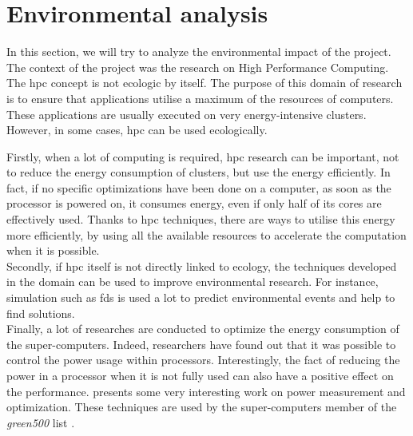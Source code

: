 
\clearpage{}
\section{Environmental analysis}

In this section, we will try to analyze the environmental impact of the
project.\\

The context of the project was the research on High Performance Computing. The
\gls{hpc} concept is not ecologic by itself. The purpose of this domain of
research is to ensure that applications utilise a maximum of the resources of
computers. These applications are usually executed on very energy-intensive
clusters. However, in some cases, \gls{hpc} can be used ecologically.

Firstly, when a lot of computing is required, \gls{hpc} research can be
important, not to reduce the energy consumption of clusters, but use the energy
efficiently. In fact, if no specific optimizations have been done on a computer,
as soon as the processor is powered on, it consumes energy, even if only half of
its cores are effectively used. Thanks to \gls{hpc} techniques, there are ways
to utilise this energy more efficiently, by using all the available resources to
accelerate the computation when it is possible.\\

Secondly, if \gls{hpc} itself is not directly linked to ecology, the techniques
developed in the domain can be used to improve environmental research. For
instance, simulation such as \gls{fds} is used a lot to predict environmental
events and help to find solutions.\\

Finally, a lot of researches are conducted to optimize the energy consumption of
the super-computers. Indeed, researchers have found out that it was possible to
control the power usage within processors. Interestingly, the fact of reducing
the power in a processor when it is not fully used can also have a positive
effect on the performance. \cite{song2009energy} presents some very interesting
work on power measurement and optimization. These techniques are used by the
super-computers member of the \textit{green500} list \cite{enwiki:1230059074}.

